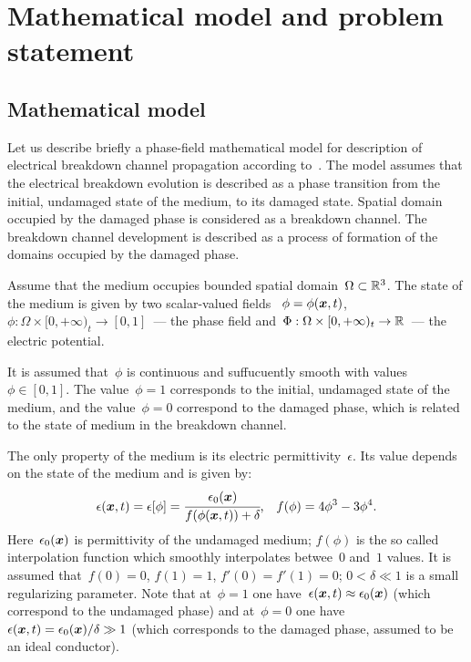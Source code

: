 
\section{Mathematical model and problem statement}
\label{sec:problem_and_model}

\subsection{Mathematical model}
Let us describe briefly a phase-field mathematical model for
description of electrical breakdown channel propagation
according to~\cite{pitike_dielectric_breakdown}.
The model assumes that the electrical breakdown evolution
is described as a phase transition from the initial, undamaged state of
the medium, to its damaged state. Spatial domain occupied by the
damaged phase is considered as a breakdown channel.
The breakdown channel development is described as a process of
formation of the domains occupied by the damaged phase.

Assume that the medium occupies bounded spatial domain~$\Omega \subset
{\mathbb{R}}^3$. The state of the medium is given by two scalar-valued fields~
$\phi = \phi({\boldsymbol{x}},t)$, $\phi: \Omega \times [0, +\infty)_t \to [0,
1]$~--- the phase field
and~$\Phi: \Omega \times [0, +\infty)_t \to {\mathbb{R}}$~--- the electric potential.

It is assumed that~$\phi$ is continuous and suffucuently smooth
with values~$\phi\in[0,1]$. The value~$\phi=1$
corresponds to the initial, undamaged state of the medium,
and the value~$\phi=0$ correspond to the damaged phase, which is
related to the state of medium in the breakdown channel.

The only property of the medium is its electric permittivity~$\epsilon$.
Its value depends on the state of the medium and is
given by:
%
\begin{equation}
  \epsilon({\boldsymbol{x}}, t) = \epsilon[\phi] = \cfrac{\epsilon_0({\boldsymbol{x}})}{f(\phi({\boldsymbol{x}}, t)) + \delta} {\text{,}} \quad f(\phi) = 4\phi^3 - 3\phi^4 {\text{.}}
  \label{eq:epsilon}
\end{equation}
Here~$\epsilon_0({\boldsymbol{x}})$ is permittivity of the undamaged medium;
$f(\phi)$ is the so called interpolation function which smoothly
interpolates betwee~$0$ and~$1$ values. It is assumed
that~$f(0) = 0$, $f(1) = 1$, $f'(0) = f'(1) = 0$;
$0 < \delta \ll 1$ is a small regularizing parameter.
Note that at~$\phi = 1$ one have~$\epsilon({\boldsymbol{x}}, t) \approx
\epsilon_0({\boldsymbol{x}})$ (which correspond to the undamaged phase)
and at~$\phi = 0$ one have $\epsilon({\boldsymbol{x}}, t) = \epsilon_0({\boldsymbol{x}}) /\delta \gg 1$
(which corresponds to the damaged phase, assumed to be an ideal conductor).


